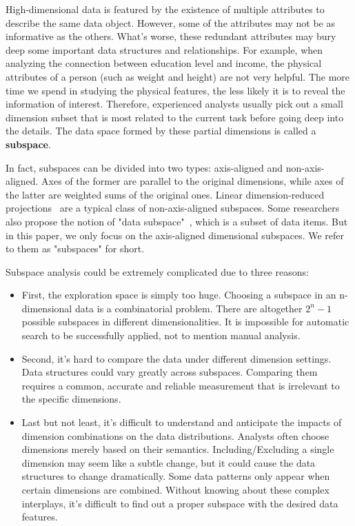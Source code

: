\maketitle

High-dimensional data is featured by the existence of multiple attributes to describe the same data object. However, some of the attributes may not be as informative as the others. What's worse, these redundant attributes may bury deep some important data structures and relationships. For example, when analyzing the connection between education level and income, the physical attributes of a person (such as weight and height) are not very helpful. The more time we spend in studying the physical features, the less likely it is to reveal the information of interest. Therefore, experienced analysts usually pick out a small dimension subset that is most related to the current task before going deep into the details. The data space formed by these partial dimensions is called a \textbf{subspace}.

In fact, subspaces can be divided into two types: axis-aligned and non-axis-aligned. Axes of the former are parallel to the original dimensions, while axes of the latter are weighted sums of the original ones. Linear dimension-reduced projections~\cite{fodor2002survey} are a typical class of non-axis-aligned subspaces. Some researchers also propose the notion of "data subspace"~\cite{DBLP:journals/tvcg/YuanRWG13}, which is a subset of data items. But in this paper, we only focus on the axis-aligned dimensional subspaces. We refer to them as "subspaces" for short.

Subspace analysis could be extremely complicated due to three reasons:
\begin{itemize} 
\item First, the exploration space is simply too huge. Choosing a subspace in an n-dimensional data is a combinatorial problem. There are altogether $2^{n}-1$ possible subspaces in different dimensionalities. It is impossible for automatic search to be successfully applied, not to mention manual analysis.
\item Second, it's hard to compare the data under different dimension settings. Data structures could vary greatly across subspaces. Comparing them requires a common, accurate and reliable measurement that is irrelevant to the specific dimensions.
\item Last but not least, it's difficult to understand and anticipate the impacts of dimension combinations on the data distributions. Analysts often choose dimensions merely based on their semantics. Including/Excluding a single dimension may seem like a subtle change, but it could cause the data structures to change dramatically. Some data patterns only appear when certain dimensions are combined. Without knowing about these complex interplays, it's difficult to find out a proper subspace with the desired data features.
\end{itemize}

